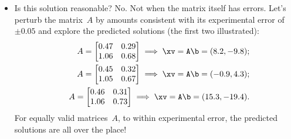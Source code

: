\begin{example}
\begin{solution}
\begin{itemize}
\item Is this solution reasonable?  No.  Not when the matrix itself has errors.
Let's perturb the matrix~\(A\) by amounts consistent with its experimental error of~\(\pm0.05\) and explore the predicted solutions (the first two illustrated):%
%
%
\begin{eqnarray*}
&&A=\begin{bmatrix} 0.47&0.29\\1.06&0.68 \end{bmatrix}
\implies \xv=\verb|A\b|=(8.2,-9.8);
\\&&A=\begin{bmatrix} 0.45&0.32\\1.05&0.67 \end{bmatrix}
\implies \xv=\verb|A\b|=(-0.9,4.3);
\\&&A=\begin{bmatrix} 0.46&0.31\\1.06&0.73 \end{bmatrix}
\implies \xv=\verb|A\b|=(15.3,-19.4).
\end{eqnarray*}
For equally valid matrices~\(A\), to within experimental error, the predicted solutions are all over the place!



\end{itemize}
\end{solution}
\end{example}
